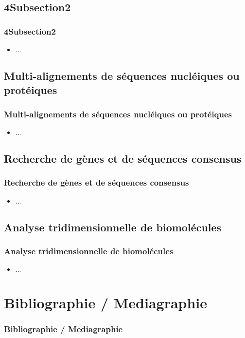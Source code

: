 \documentclass{beamer}
\begin{document}
\subsection{ \titleSection4Subsection2 }
\begin{frame}
	\frametitle{ \titleSection4Subsection2 }
	\begin{itemize}
		\item ... 
	\end{itemize}
\end{frame}

\def\titleSection4Subsection3{Multi-alignements de s{\'e}quences nucl{\'e}iques ou prot{\'e}iques}
\subsection{ \titleSection4Subsection3 }
\begin{frame}
	\frametitle{ \titleSection4Subsection3 }
	\begin{itemize}
		\item ... 
	\end{itemize}
\end{frame}

\def\titleSection4Subsection4{Recherche de g{\`e}nes et de s{\'e}quences consensus}
\subsection{ \titleSection4Subsection4 }
\begin{frame}
	\frametitle{ \titleSection4Subsection4 }
	\begin{itemize}
		\item ... 
	\end{itemize}
\end{frame}

\def\titleSection4Subsection5{Analyse tridimensionnelle de biomol{\'e}cules}
\subsection{ \titleSection4Subsection5 }
\begin{frame}
	\frametitle{ \titleSection4Subsection5 }
	\begin{itemize}
		\item ... 
	\end{itemize}
\end{frame}


\def\sectionPartBibliographie{Bibliographie / Mediagraphie}
\section{\sectionPartBibliographie}
\begin{frame}[allowframebreaks]
	\frametitle{\sectionPartBibliographie}
	\nocite{*}
	
	
\end{frame}
\end{document}
